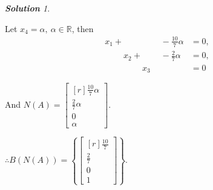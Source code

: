 \documentclass[12pt, letterpaper]{article}
\theoremstyle{remark}
\theoremstyle{remark}
\newtheorem*{solution}{\textbf{Solution}}
\begin{document}
\begin{solution}
\begin{enumerate}[(a)]
		      Let \(x_4 = \alpha,\ \alpha \in \mathbb{R}\), then \begin{align*}
			      x_1 + \phantom{x_2} \phantom{+} \phantom{x_3} \phantom{+} -\frac{10}{7}\alpha     & = 0, \\
			      \phantom{x_1} \phantom{+} x_2 + \phantom{x_3} \phantom{+} -\frac{2}{7}\alpha      & = 0, \\
			      \phantom{x_1} \phantom{+} \phantom{x_2} \phantom{+} x_3 \phantom{+} \phantom{x_4} & = 0
		      \end{align*}

		      And \(N(A) = \begin{bmatrix*}[r]
			      \frac{10}{7}\alpha \\
			      \frac{2}{7}\alpha \\
			      0 \\
			      \alpha
              \end{bmatrix*}. \)
              
              \(\therefore B(N(A)) = \left\{\begin{bmatrix*}[r]
			      \frac{10}{7} \\
			      \frac{2}{7} \\
			      0 \\
			      1
		      \end{bmatrix*}\right\}.\)


	\end{enumerate}

\end{solution}
\end{document}
